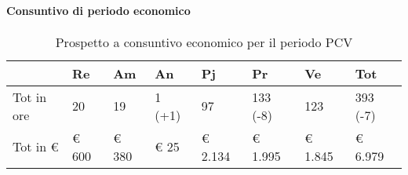 \paragraph{Consuntivo di periodo economico}
\begin{table}[H] \begin{center} \begin{tabular}{llllllll}																						
			\toprule	
			&	Re		&	Am		&	An		&	Pj		&	Pr		&	Ve		&	Tot	 \\ 	
			\midrule																		
			Tot in ore	&	20		&	19		&	1	(+1)&	97		&	133	(-8)&	123	&	393	(-7)\\
			Tot in €	&	 € 600 		 & 	 € 380 		 & 	 € 25 		 & 	 € 2.134 		 & 	 € 1.995 		 & 	 € 1.845 		 & 	 € 6.979 	\\
			\bottomrule																						
		\end{tabular} \end{center} \caption{Prospetto a consuntivo economico per il periodo PCV																					
	}\label{tab:s_PCV_c} \end{table}


				
